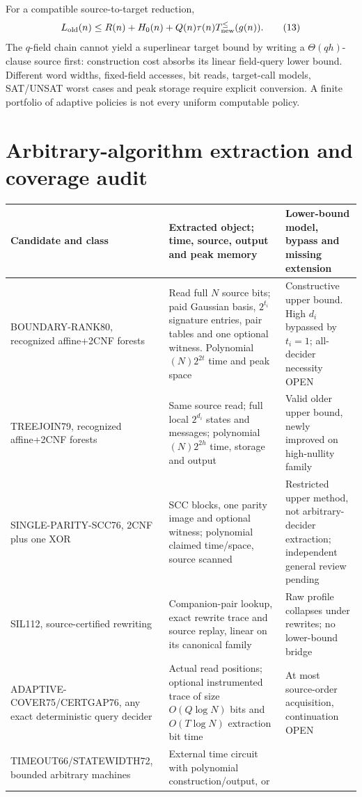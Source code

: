 \documentclass[11pt]{article}
\begin{document}
For a compatible source-to-target reduction,
\[
L_{\rm old}(n)\le R(n)+H_0(n)+Q(n)\tau(n)
                         T_{\rm new}^{\le}(g(n)). \tag{13}
\]
The $q$-field chain cannot yield a superlinear target bound
by writing a $\Theta(qh)$-clause source first: construction
cost absorbs its linear field-query lower bound. Different
word widths, fixed-field accesses, bit reads, target-call models,
SAT/UNSAT worst cases and peak storage require explicit
conversion. A finite portfolio of adaptive policies is
not every uniform computable policy.

\section{Arbitrary-algorithm extraction and coverage audit}
\small
\begin{longtable}{p{.19\linewidth}p{.38\linewidth}p{.32\linewidth}}
\toprule
Candidate and class & Extracted object; time, source, output and peak memory &
Lower-bound model, bypass and missing extension\\\midrule\endhead
BOUNDARY-RANK80, recognized affine+2CNF forests &
Read full $N$ source bits; paid Gaussian basis, $2^{t_i}$
signature entries, pair tables and one optional witness.
Polynomial$(N)2^{2t}$ time and peak space &
Constructive upper bound. High $d_i$ bypassed by $t_i=1$;
all-decider necessity OPEN\\
TREEJOIN79, recognized affine+2CNF forests &
Same source read; full local $2^{d_i}$ states and messages;
polynomial$(N)2^{2h}$ time, storage and output &
Valid older upper bound, newly improved on high-nullity family\\
SINGLE-PARITY-SCC76, 2CNF plus one XOR &
SCC blocks, one parity image and optional witness;
polynomial claimed time/space, source scanned &
Restricted upper method, not arbitrary-decider extraction;
independent general review pending\\
SIL112, source-certified rewriting &
Companion-pair lookup, exact rewrite trace and source replay,
linear on its canonical family &
Raw profile collapses under rewrites; no lower-bound bridge\\
ADAPTIVE-COVER75/CERTGAP76, any exact deterministic query decider &
Actual read positions; optional instrumented trace of size
$O(Q\log N)$ bits and $O(T\log N)$ extraction bit time &
At most source-order acquisition, continuation OPEN\\
TIMEOUT66/STATEWIDTH72, bounded arbitrary machines &
External time circuit with polynomial construction/output, or

\end{longtable}
\end{document}
